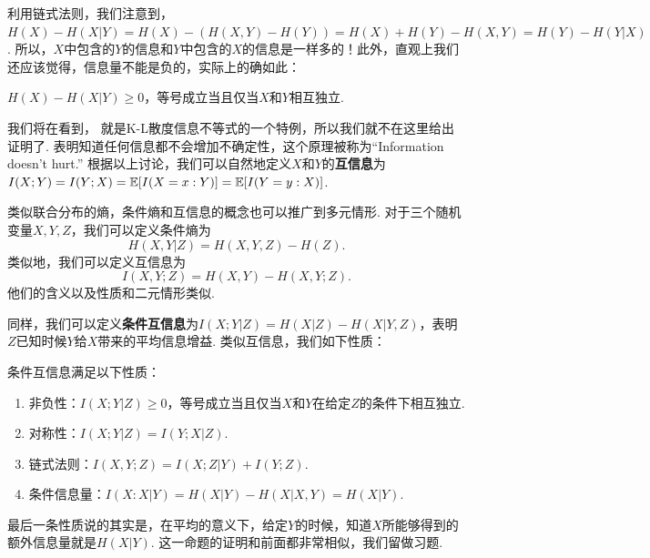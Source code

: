 利用链式法则，我们注意到，$H(X)-H(X|Y)=H(X)-(H(X,Y)-H(Y))=H(X)+H(Y)-H(X,Y)=H(Y)-H(Y|X)$. 所以，$X$中包含的$Y$的信息和$Y$中包含的$X$的信息是一样多的！此外，直观上我们还应该觉得，信息量不能是负的，实际上的确如此：
\begin{proposition}\label{prop:information-doesnt-hurt}
    $H(X)-H(X|Y)\geq 0$，等号成立当且仅当$X$和$Y$相互独立.
\end{proposition}

我们将在看到， 就是K-L散度信息不等式的一个特例，所以我们就不在这里给出证明了.  表明知道任何信息都不会增加不确定性，这个原理被称为“Information doesn't hurt.” 根据以上讨论，我们可以自然地定义$X$和$Y$的\textbf{互信息}为$I(X;Y)=I(Y;X)=\mathbb{E}[I(X=x:Y)]=\mathbb{E}[I(Y=y:X)]$.

类似联合分布的熵，条件熵和互信息的概念也可以推广到多元情形. 对于三个随机变量$X,Y,Z$，我们可以定义条件熵为
\[H(X,Y|Z)=H(X,Y,Z)-H(Z).\]
类似地，我们可以定义互信息为
\[I(X,Y;Z)=H(X,Y)-H(X,Y;Z).\]
他们的含义以及性质和二元情形类似.

同样，我们可以定义\textbf{条件互信息}为$I(X;Y|Z)=H(X|Z)-H(X|Y,Z)$，表明$Z$已知时候$Y$给$X$带来的平均信息增益. 类似互信息，我们如下性质：
\begin{proposition}\label{prop:conditional-mutual-information}
    条件互信息满足以下性质：
    \begin{enumerate}
        \item 非负性：$I(X;Y|Z)\geq 0$，等号成立当且仅当$X$和$Y$在给定$Z$的条件下相互独立.
        \item 对称性：$I(X;Y|Z)=I(Y;X|Z)$.
        \item 链式法则：$I(X,Y;Z)=I(X;Z|Y)+I(Y;Z)$.
        \item 条件信息量：$I(X:X|Y)=H(X|Y)-H(X|X,Y)=H(X|Y)$.
    \end{enumerate}
\end{proposition}
最后一条性质说的其实是，在平均的意义下，给定$Y$的时候，知道$X$所能够得到的额外信息量就是$H(X|Y)$. 这一命题的证明和前面都非常相似，我们留做习题.

